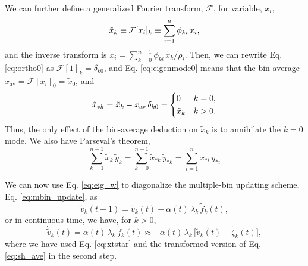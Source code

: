 \documentclass[preprint, superscriptaddress, floatfix]{revtex4-1}
\newcommand{\bav}[1]{#1_\mathrm{av}}
\begin{document}
We can further define
a generalized Fourier transform, $\mathcal{F}$,
for variable, $x_i$,
%
\begin{equation}
  {\tilde x}_k
  \equiv \mathcal{F}[x_i]_k
  \equiv \sum_{i = 1}^n \phi_{ki} \, x_i
  ,
  \notag
\end{equation}
%
and the inverse transform is
$x_i = \sum_{k = 0}^{n-1} \phi_{ki} \, \tilde{x}_k / \rho_i$.
%
%
Then,
we can rewrite Eq. \eqref{eq:ortho0} as
$\mathcal F[1]_k = \delta_{k0}$,
%
and Eq. \eqref{eq:eigenmode0} means that
the bin average
$\bav{x}= \mathcal F[x_i]_0 = \tilde x_0$,
%
and
\begin{equation}
  \tilde x_{*k}
  = \tilde x_k - \bav{x} \, \delta_{k0}
  =
  \begin{dcases}
    0           & k = 0
    ,
    \\
    \tilde x_k  & k > 0
    .
  \end{dcases}
  \label{eq:xtstar}
\end{equation}
%
Thus, the only effect
of the bin-average deduction on $\tilde x_k$ is to
annihilate the $k=0$ mode.
%
We also have Parseval's theorem,
\begin{equation}
  \sum_{k=1}^{n-1} \tilde x_k \, \tilde y_k
  =
  \sum_{k=0}^{n-1} \tilde x_{*k} \, \tilde y_{*k}
  =
  \sum_{i=1}^n x_{*i} \, y_{*i}
  \label{eq:parseval}
\end{equation}

We can now use Eq. \eqref{eq:eig_w} to diagonalize
the multiple-bin updating scheme, Eq. \eqref{eq:mbin_update},
as
%
\begin{equation}
  {\tilde v}_k(t + 1) =
  {\tilde v}_k(t) + \alpha(t) \, \lambda_k \,
  {\tilde f}_k(t)
  ,
  \label{eq:vkupdate}
\end{equation}
%
or in continuous time, we have, for $k > 0$,
%
\begin{equation}
  \dot{\tilde v}_k(t)
  =
  \alpha(t) \, \lambda_k \, {\tilde f}_k(t)
  \approx
  -\alpha(t) \, \lambda_k \,
  \bigl[ {\tilde v}_k(t) - {\tilde \zeta}_k(t) \bigr]
  ,
  \label{eq:vt_diffeq_mbin}
\end{equation}
%
where
we have used Eq. \eqref{eq:xtstar} and
the transformed version of Eq. \eqref{eq:sh_ave}
in the second step.
\end{document}
